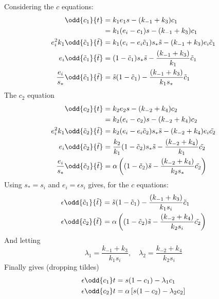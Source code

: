 \documentclass{X:/Documents/Coding/Latex/myassignment}
\begin{document}
\begin{enumerate}
\begin{enumerate}
		Considering the $c$ equations:
		\begin{align*}
			\odd{c_1}{t} &= k_1e_1s -  (k_{-1}+k_3)c_1\\
			&= k_1(e_i - c_1)s -  (k_{-1}+k_3)c_1\\
			e_i^2 k_1 \odd{\tilde{c}_1}{\tilde{t}} &= k_1(e_i - e_i\tilde{c}_1)s_*\tilde{s} -  (k_{-1}+k_3)e_i \tilde{c}_1\\
			e_i \odd{\tilde{c}_1}{\tilde{t}} &= (1 - \tilde{c}_1)s_*\tilde{s} -  \frac{(k_{-1}+k_3)}{k_1} \tilde{c}_1\\
			\frac{e_i}{s_*} \odd{\tilde{c}_1}{\tilde{t}} &= \tilde{s}(1 - \tilde{c}_1) -  \frac{(k_{-1}+k_3)}{k_1s_*} \tilde{c}_1\\
		\end{align*}
		The $c_2$ equation
		\begin{align*}
			\odd{c_2}{t} &=k_2e_2s  - (k_{-2}+k_4)c_2\\
			&= k_2(e_i - c_2)s -  (k_{-2}+k_4)c_2\\
			e_i^2k_1\odd{\tilde{c}_2}{\tilde{t}} &= k_2(e_i - e_i\tilde{c}_2)s_*\tilde{s} -  (k_{-2}+k_4)e_i\tilde{c_2}\\
			e_i\odd{\tilde{c}_2}{\tilde{t}} &= \frac{k_2}{k_1}(1 - \tilde{c}_2)s_*\tilde{s} -  \frac{(k_{-2}+k_4)}{k_1}\tilde{c_2}\\
			\frac{e_i}{s_*}\odd{\tilde{c}_2}{\tilde{t}} &= \alpha\left((1 - \tilde{c}_2)\tilde{s} -  \frac{(k_{-2}+k_4)}{k_2s_*}\tilde{c_2}\right)\\
		\end{align*}
		Using $s_* = s_i$ and $e_i = \epsilon s_i$ gives, for the $c$ equations:
		\begin{align*}	
			\epsilon \odd{\tilde{c}_1}{\tilde{t}} &= \tilde{s}(1 - \tilde{c}_1) -  \frac{(k_{-1}+k_3)}{k_1s_i} \tilde{c}_1\\
			\epsilon\odd{\tilde{c}_2}{\tilde{t}} &= \alpha\left((1 - \tilde{c}_2)\tilde{s} - \frac{(k_{-2}+k_4)}{k_2s_i}\tilde{c_2}\right)\\
		\end{align*}
		And letting 
		\[\lambda_1 = \frac{k_{-1} + k_3}{k_1s_i}, \quad \lambda_2 = \frac{k_{-2} + k_4}{k_2 s_i}\]
		Finally gives (dropping tildes)
		\begin{align*}
			\epsilon \odd{c_1}t &= s(1-c_1) - \lambda_1 c_1\\
			\epsilon \odd{c_2}t &= \alpha \left[ s (1- c_2) - \lambda_2 c_2\right]
		\end{align*}


\end{enumerate}
\end{enumerate}
\end{document}
